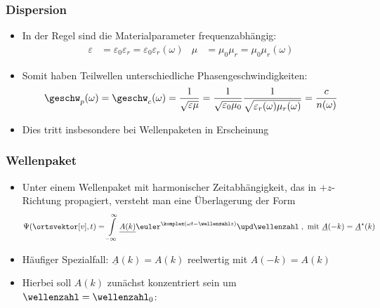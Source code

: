 \begin{frame}
  \frametitle{Dispersion}
  \begin{itemize}[<+->]
  \item In der Regel sind die Materialparameter \alert{frequenzabhängig}:
    \begin{align*}
      \varepsilon &= \varepsilon_0\varepsilon_r = \varepsilon_0\varepsilon_r(\omega) & \mu &= \mu_0\mu_r = \mu_0\mu_r(\omega)  
    \end{align*}
  \item Somit haben \alert{Teilwellen unterschiedliche Phasengeschwindigkeiten}:
    \begin{equation*}
      \geschw_p (\omega) = \geschw_c(\omega) = \frac{1}{\sqrt{\varepsilon\mu}} = \frac{1}{\sqrt{\varepsilon_0\mu_0}} \frac{1}{\sqrt{\varepsilon_r(\omega)\mu_r(\omega)}}=\frac{c}{n(\omega)} 
    \end{equation*}
  \item Dies tritt insbesondere bei \alert{Wellenpaketen} in Erscheinung
  \end{itemize}
  \end{frame}

  
\begin{frame}
  \frametitle{Wellenpaket}
      \begin{itemize}[<+->]
    \item Unter einem Wellenpaket mit \alert{harmonischer Zeitabhängigkeit}, das in \alert{\(+z\)-Richtung} propagiert, versteht man eine Überlagerung der Form
    \begin{equation*}
      \Psi (\ortsvektor[v], t) = \int\limits_{-\infty}^\infty \underline{A(k)} \euler^{\komplex (\omega t - \wellenzahl z)} \upd \wellenzahl\; , \text{ mit } \underline{A}(-k) = \underline{A}^\star(k)
    \end{equation*}
    \item Häufiger Spezialfall: $\underline{A}(k) = A(k)$ reelwertig mit $A(-k) = A(k)$
  \item Hierbei soll \(A(k)\) zunächst \alert{konzentriert} sein um \(\wellenzahl = \wellenzahl_0\): 

    \end{itemize}
  \end{frame}



